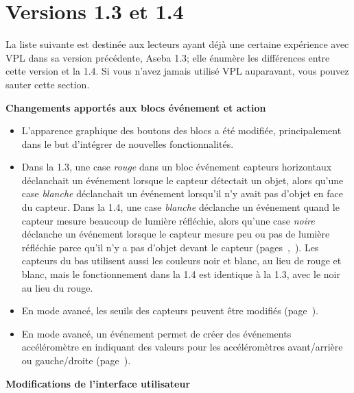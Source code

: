 \chapter*{Versions 1.3 et 1.4}

La liste suivante est destinée aux lecteurs ayant déjà une certaine expérience avec VPL dans sa version précédente, Aseba 1.3; elle énumère les différences entre cette version et la 1.4.
Si vous n'avez jamais utilisé VPL auparavant, vous pouvez sauter cette section.

\textbf{Changements apportés aux blocs événement et action}

\begin{itemize}

\item L'apparence graphique des boutons des blocs a été modifiée, principalement dans le but d'intégrer
de nouvelles fonctionnalités.

\item Dans la 1.3, une case \emph{rouge} dans un bloc événement capteurs horizontaux déclanchait un événement
lorsque le capteur détectait un objet, alors qu'une case \emph{blanche} déclanchait un événement lorsqu'il n'y
avait pas d'objet en face du capteur.
Dans la 1.4, une case \emph{blanche} déclanche un événement quand le capteur mesure beaucoup de lumière réfléchie,
alors qu'une case \emph{noire} déclanche un événement lorsque le capteur mesure peu ou pas de lumière réfléchie
parce qu'il n'y a pas d'objet devant le capteur (pages~\pageref{p.proximity-colors1},~\pageref{p.proximity-colors2}).
Les capteurs du bas utilisent aussi les couleurs noir et blanc, au lieu de rouge et blanc,
mais le fonctionnement dans la 1.4 est identique à la 1.3, avec le noir au lieu du rouge.

\item En mode avancé, les seuils des capteurs peuvent être modifiés (page~\pageref{p.accel}).

\item En mode avancé, un événement permet de créer des événements accéléromètre en indiquant des valeurs pour les accéléromètres avant/arrière ou gauche/droite (page~\pageref{p.accel}).

\end{itemize}

\textbf{Modifications de l'interface utilisateur}

